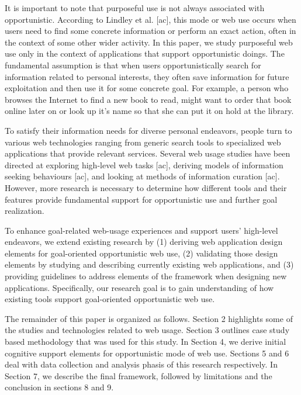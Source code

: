 \documentclass{casconpaper}
\begin{document}
{It is important to note that purposeful use is not always associated with opportunistic. According to Lindley et al. [ac], this mode or web use occurs when users need to find some concrete information or perform an exact action, often in the context of some other wider activity. In this paper, we study purposeful web use only in the context of applications that support opportunistic doings. The fundamental assumption is that when users opportunistically search for information related to personal interests, they often save information for future exploitation and then use it for some concrete goal. For example, a person who browses the Internet to find a new book to read, might want to order that book online later on or look up it’s name so that she can put it on hold at the library. 

To satisfy their information needs for diverse personal endeavors, people turn to various web technologies ranging from generic search tools to specialized web applications that provide relevant services. Several web usage studies have been directed at exploring high-level web tasks [ac], deriving models of information seeking behaviours [ac], and looking at methods of information curation [ac]. However, more research is necessary to determine how different tools and their features provide fundamental support for opportunistic use and further goal realization.

To enhance goal-related web-usage experiences and support users’ high-level endeavors, we extend existing research by (1) deriving web application design elements for goal-oriented opportunistic web use, (2) validating those design elements by studying and describing currently existing web applications, and (3) providing guidelines to address elements of the framework when designing new applications. Specifically, our research goal is to gain understanding of how existing tools support goal-oriented opportunistic web use. 

The remainder of this paper is organized as follows. Section 2 highlights some of the studies and technologies related to web usage. Section 3 outlines case study based methodology that was used for this study. In Section 4, we derive initial cognitive support elements for opportunistic mode of web use.  Sections 5 and 6 deal with data collection and analysis phasis of this research respectively. In Section 7, we describe the final framework, followed by limitations and the conclusion in sections 8 and 9.

} %
\end{document}
